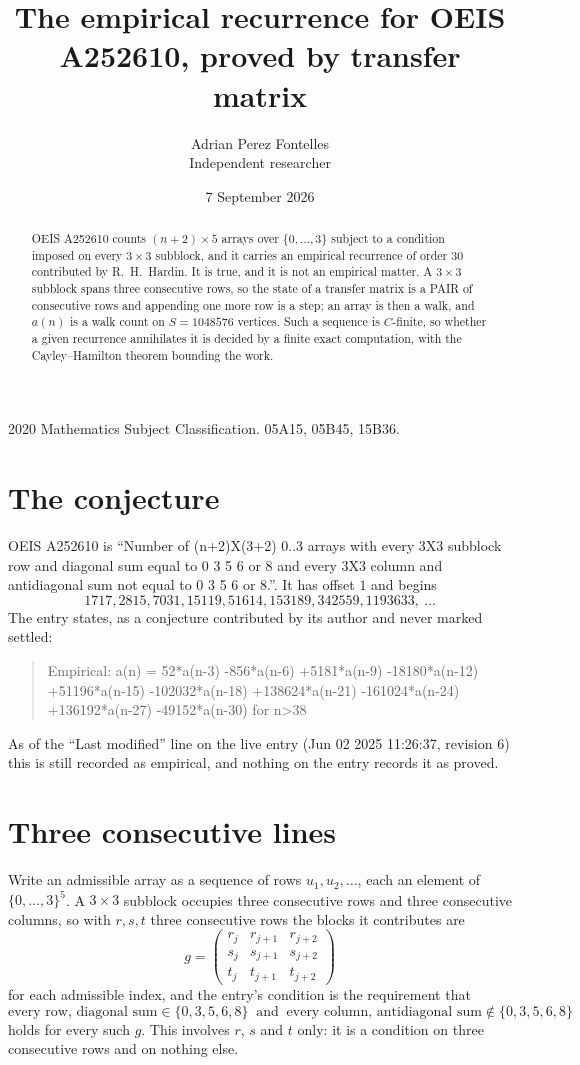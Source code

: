 \documentclass[11pt,a4paper]{article}
\title{The empirical recurrence for OEIS A252610, proved by transfer matrix}
\author{Adrian Perez Fontelles\\ \small Independent researcher}
\date{7 September 2026}
\theoremstyle{plain}
\theoremstyle{definition}
\begin{document}
\maketitle

\begin{abstract}
OEIS A252610 counts $(n+2)\times5$ arrays over $\{0,\dots,3\}$ subject to a condition imposed on
every $3\times3$ subblock, and it carries an empirical recurrence of order $30$
contributed by R.~H.~Hardin. It is true, and it is not an empirical matter. A $3\times3$
subblock spans three consecutive rows, so the state of a transfer matrix is a PAIR of
consecutive rows and appending one more row is a step; an array is then a walk, and
$a(n)$ is a walk count on $S=1048576$ vertices. Such a sequence is $C$-finite, so whether a given
recurrence annihilates it is decided by a finite exact computation, with the Cayley--Hamilton
theorem bounding the work.
\end{abstract}

\noindent\small 2020 Mathematics Subject Classification. 05A15, 05B45, 15B36.\normalsize

\section{The conjecture}

OEIS A252610 is ``Number of (n+2)X(3+2) 0..3 arrays with every 3X3 subblock row and diagonal sum equal to 0 3 5 6 or 8 and every 3X3 column and antidiagonal sum not equal to 0 3 5 6 or 8.''. It has offset $1$ and begins
\[
1717, 2815, 7031, 15119, 51614, 153189, 342559, 1193633,\ \dots
\]
The entry states, as a conjecture contributed by its author and never marked settled:
\begin{quote}
Empirical: a(n) = 52*a(n-3) -856*a(n-6) +5181*a(n-9) -18180*a(n-12) +51196*a(n-15) -102032*a(n-18) +138624*a(n-21) -161024*a(n-24) +136192*a(n-27) -49152*a(n-30) for n>38
\end{quote}
As of the ``Last modified'' line on the live entry (Jun 02 2025 11:26:37, revision 6) this is still
recorded as empirical, and nothing on the entry records it as proved.

\section{Three consecutive lines}

Write an admissible array as a sequence of rows $u_1,u_2,\dots$, each an element of
$\{0,\dots,3\}^{5}$. A $3\times3$ subblock occupies three consecutive rows and
three consecutive columns, so with $r,s,t$ three consecutive rows the blocks it
contributes are
\[
g=\begin{pmatrix}r_j&r_{j+1}&r_{j+2}\\ s_j&s_{j+1}&s_{j+2}\\ t_j&t_{j+1}&t_{j+2}\end{pmatrix}
\]
for each admissible index, and the entry's condition is the requirement that
\[
\text{every row, diagonal sum} \in \{0,3,5,6,8\}\ \text{ and }\ \text{every column, antidiagonal sum} \notin \{0,3,5,6,8\}
\]
holds for every such $g$. This involves $r$, $s$ and $t$ only: it is a condition on
three consecutive rows and on nothing else.
\end{document}
